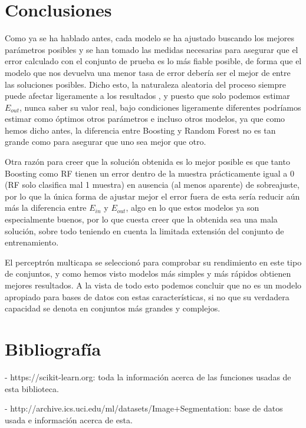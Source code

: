 \documentclass{article}
\begin{document}
	\section{Conclusiones}
	Como ya se ha hablado antes, cada modelo se ha ajustado buscando los mejores parámetros posibles y se han tomado las medidas necesarias para asegurar que el error calculado con el conjunto de prueba es lo más fiable posible, de forma que el modelo que nos devuelva una menor tasa de error debería ser el mejor de entre las soluciones posibles. Dicho esto, la naturaleza aleatoria del proceso siempre puede afectar ligeramente a los resultados , y puesto que solo podemos estimar $E_{out}$, nunca saber su valor real, bajo condiciones ligeramente diferentes podríamos estimar como óptimos otros parámetros e incluso otros modelos, ya que como hemos dicho antes, la diferencia entre Boosting y Random Forest no es tan grande como para asegurar que uno sea mejor que otro.
	\par 
	Otra razón para creer que la solución obtenida es lo mejor posible es que tanto Boosting como RF tienen un error dentro de la muestra prácticamente igual a 0 (RF solo clasifica mal 1 muestra) en ausencia (al menos aparente) de sobreajuste, por lo que la única forma de ajustar mejor el error fuera de esta sería reducir aún más la diferencia entre $E_{in}$ y $E_{out}$, algo en lo que estos modelos ya son especialmente buenos, por lo que cuesta creer que la obtenida sea una mala solución, sobre todo teniendo en cuenta la limitada extensión del conjunto de entrenamiento.
	\par
	 El perceptrón multicapa se seleccionó para comprobar su rendimiento en este tipo de conjuntos, y como hemos visto modelos más simples y más rápidos obtienen mejores resultados. A la vista de todo esto podemos concluir que no es un modelo apropiado para bases de datos con estas características, si no que su verdadera capacidad se denota en conjuntos más grandes y complejos.
	\section{Bibliografía}
	- https://scikit-learn.org: toda la información acerca de las funciones usadas de esta biblioteca.\par
	- http://archive.ics.uci.edu/ml/datasets/Image+Segmentation: base de datos usada e información acerca de esta.
	
	
\end{document}
